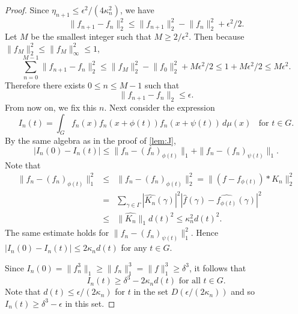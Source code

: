 \documentclass[10pt]{article}
\theoremstyle{definition}
\begin{document}
\begin{proof}
		Since $\eta_{n+1} \leq \epsilon^2/(4 \kappa_n^2)$, we have
    \[
        \lVert f_{n+1} - f_n \rVert_2^2 \leq \lVert f_{n+1} \rVert_2^2 - \lVert f_n \rVert_2^2 + \epsilon^2/2.
    \]
     Let $M$ be the smallest integer such that $M \geq 2/\epsilon^2$. Then because $\lVert f_M \rVert_2^2 \leq \lVert f_M \rVert_{\infty}^2 \leq 1$,
    \[
        \sum_{n=0}^{M-1} \lVert f_{n+1} - f_n \rVert_2^2 \leq \lVert f_M \rVert_2^2 - \lVert f_0 \rVert_2^2 + M \epsilon^2/2 \leq 1 + M \epsilon^2/2 \leq M \epsilon^2.
    \]
    Therefore there exists $0 \leq n \leq M - 1$ such that
    \[
        \lVert f_{n+1} - f_n \rVert_2 \leq \epsilon.
    \]
    From now on, we fix this $n$.
    Next consider the expression
    \[
        I_n(t) = \int_G f_n(x) f_n(x+\phi(t)) f_n(x + \psi(t)) \, d \mu(x) \; \; \text{ for } t \in G.
    \]
    By the same algebra as in the proof of \cref{lem:J},
    \[
        |I_n(0) - I_n(t)| \leq \| f_n - (f_n)_{\phi(t)} \|_1 + \| f_n - (f_n)_{\psi(t)} \|_1. 			
    \]
	Note that
	\begin{eqnarray*}
		\| f_n - (f_n)_{\phi(t)} \|^2_1 &\leq & \| f_n - (f_n)_{\phi(t)} \|_2^2 = \| (f - f_{\phi(t)})*K_n \|_2^2 \\
		&=& \sum_{\gamma \in \Gamma} \left| \widehat{K_n}(\gamma) \right|^2 \left|\widehat{f}(\gamma) - \widehat{f_{\phi(t)}}(\gamma) \right|^2 \\
		&\leq & \| \widehat{K_n} \|_1 d(t)^2 \leq \kappa_n^2 d(t)^2.
		\end{eqnarray*}
		The same estimate holds for $\| f_n - (f_n)_{\psi(t)} \|_1^2$. Hence $|I_n(0) - I_n(t)| \leq 2 \kappa_n d(t)$ for any $t \in G$.
		
    Since $I_n(0) = \lVert f_n^3 \rVert_1 \geq \lVert f_n \rVert_1^3 = \lVert f \rVert_1^3 \geq \delta^3$, it follows that
    \[
        I_n(t) \geq \delta^3 - 2 \kappa_n d(t) \text{ for all } t \in G.
    \]
    Note that $d(t) \leq \epsilon/(2\kappa_n)$ for $t$ in the set $D(\epsilon/(2 \kappa_n))$ and so $I_n(t) \geq \delta^3 - \epsilon$ in this set. 
    
    

\end{proof}
\end{document}
